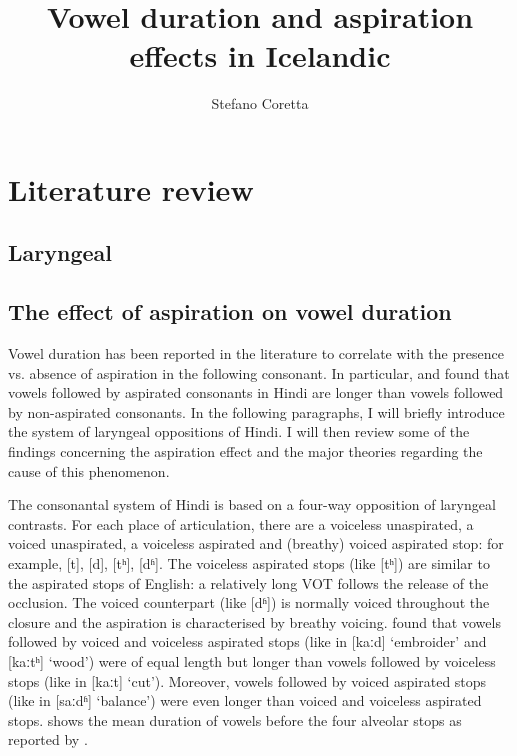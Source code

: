 \documentclass[11pt,a4paper,openany]{memoir}\usepackage[]{graphicx}\usepackage[]{color}
\title{Vowel duration and aspiration effects in Icelandic}
\author{Stefano Coretta}
\begin{document}
\frontmatter

\begin{titlingpage}
\maketitle
\end{titlingpage}

\tableofcontents*

\mainmatter





\chapter{Literature review}
\label{c:review}

\section{Laryngeal}



\section{The effect of aspiration on vowel duration}
\label{s:aspiration}

Vowel duration has been reported in the literature to correlate with the presence vs. absence of aspiration in the following consonant.
In particular, \citet{maddieson1976} and \citet{durvasula2012} found that vowels followed by aspirated consonants in Hindi are longer than vowels followed by non-aspirated consonants.
In the following paragraphs, I will briefly introduce the system of laryngeal oppositions of Hindi.
I will then review some of the findings concerning the aspiration effect and the major theories regarding the cause of this phenomenon.

The consonantal system of Hindi is based on a four-way opposition of laryngeal contrasts.
For each place of articulation, there are a voiceless unaspirated, a voiced unaspirated, a voiceless aspirated and (breathy) voiced aspirated stop: for example, [t], [d], [tʰ], [dʱ].
The voiceless aspirated stops (like [tʰ]) are similar to the aspirated stops of English: a relatively long VOT follows the release of the occlusion.
The voiced counterpart (like [dʱ]) is normally voiced throughout the closure and the aspiration is characterised by breathy voicing.
\citet{maddieson1976} found that vowels followed by voiced and voiceless aspirated stops (like in [kaːd] `embroider' and [kaːtʰ] `wood') were of equal length but longer than vowels followed by voiceless stops (like in [kaːt] `cut').
Moreover, vowels followed by voiced aspirated stops (like in [saːdʱ] `balance') were even longer than voiced and voiceless aspirated stops.
 shows the mean duration of vowels before the four alveolar stops as reported by \citet[47]{maddieson1976}.
\end{document}
